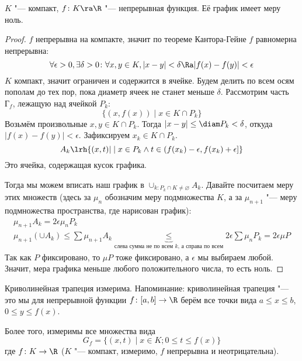 \begin{theorem}
	$K$ "--- компакт, $f\colon K \ra \R$ "--- непрерывная функция.
	Её график имеет меру ноль.
\end{theorem}
\begin{proof}
	$f$ непрерывна на компакте, значит по теореме Кантора-Гейне $f$ равномерна непрерывна:
	\[ \forall \epsilon > 0, \exists \delta > 0\colon \forall x, y \in K, |x - y| < \delta \Ra |f(x) - f(y)| < \epsilon \]
	$K$ компакт, значит ограничен и содержится в ячейке.
	Будем делить по всем осям пополам до тех пор, пока диаметр ячеек не станет меньше $\delta$.
	Рассмотрим часть $Г_f$, лежащую над ячейкой $P_k$:
	\[ \{(x, f(x)) \mid x \in K \cap P_k \} \]
	Возьмём произвольные $x, y \in K \cap P_k$.
	Тогда $|x - y| \le \diam P_k < \delta$, откуда $|f(x) - f(y)| < \epsilon$.
	Зафиксируем $x_k \in K \cap P_k$.
	\[ A_k \lrh \{(x, t) | \mid x \in P_k \land t \in (f(x_k) - \epsilon, f(x_k) + \epsilon] \} \]
	Это ячейка, содержащая кусок графика.
	\begin{center}
	
	\end{center}
	Тогда мы можем вписать наш график в $\cup_{k \colon P_k \cap K \neq \varnothing} A_k$.
	Давайте посчитаем меру этих множеств (здесь за $\mu_n$ обозначим меру подмножества $K$, а за $\mu_{n+1}$ "--- меру подмножества пространства, где нарисован график):
	\begin{gather*}
	  \mu_{n+1} A_k = 2\epsilon \mu_n P_k \\
	  \mu_{n+1} (\cup A_k) \le \sum \mu_{n+1} A_k \underbrace{\le}_{\text{слева сумма не по всем $k$, а справа по всем}} 2\epsilon \sum \mu_n P_k = 2\epsilon \mu P
	\end{gather*}
	Так как $P$ фиксировано, то $\mu P$ тоже фиксировано, а $\epsilon$ мы выбираем любой.
	Значит, мера графика меньше любого положительного числа, то есть ноль.
\end{proof}
\begin{conseq}
	Криволинейная трапеция  измерима.
	Напоминание: криволинейная трапеция "--- это мы для непрерывной
	функции $f\colon [a, b] \to \R$ берём все точки вида $a \le x \le b$, $0 \le y \le f(x)$.
	\begin{center}
	
	\end{center}

	Более того, измеримы все множества вида
	\[ G_f = \{(x, t) \mid x \in K; 0 \le t \le f(x)\} \]
	где	$f \colon K \to \R$ ($K$ "--- компакт, измеримо, $f$ непрерывна и неотрицательна).
\end{conseq}
